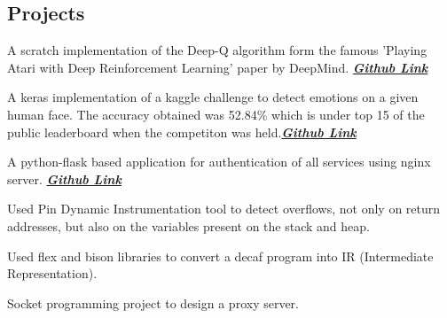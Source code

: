 \documentclass[letterpaper]{deedy-resume} %
\begin{document}
\begin{minipage}[t]{0.66\textwidth}
\subsection{Projects}
\vspace{\topsep} %
\begin{tightitemize}
\item {} A scratch implementation of the Deep-Q algorithm form the famous 'Playing Atari with Deep Reinforcement Learning' paper by DeepMind. {\footnotesize \textit{\textbf{\href{https://github.com/jayanthkaturi/deepRL_agent}{Github Link} }}}
\item {} A keras implementation of a kaggle challenge to detect emotions on a given human face. The accuracy obtained was 52.84\% which is under top 15 of the public leaderboard when the competiton was held.{\footnotesize \textit{\textbf{\href{https://github.com/jayanthkaturi/emotion_detection}{Github Link} }}}
\item {} A python-flask based application for authentication of all services using nginx server. {\footnotesize \textit{\textbf{\href{https://github.com/jayanthkaturi/nginx-auth-proxy}{Github Link}}}}
\item {} Used Pin Dynamic Instrumentation tool to detect overflows, not only on return addresses, but also on the variables present on the stack and heap.
\item {} Used flex and bison libraries to
convert a decaf program into IR (Intermediate Representation).
\item {} Socket programming project to design a proxy server.
\end{tightitemize}

\sectionspace %


\end{minipage} %

\end{document}
